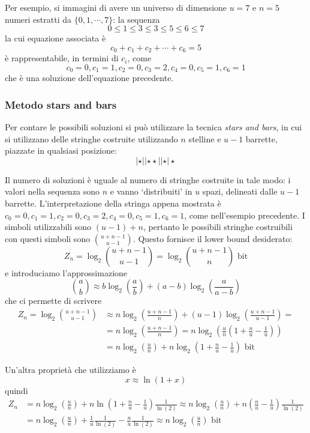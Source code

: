 Per esempio, si immagini di avere un universo di dimensione $u = 7$ e $n = 5$ numeri
estratti da $\{0, 1, \cdots, 7\}$: la sequenza
$$
	0 \leq 1 \leq 3 \leq 3 \leq 5 \leq 6 \le 7
$$
la cui equazione associata è
$$
	c_0 + c_1 + c_2 + \cdots + c_6 = 5
$$
è rappresentabile, in termini di $c_i$, come
$$
	c_0 = 0, c_1 = 1, c_2 = 0, c_3 = 2, c_4 = 0, c_5 = 1, c_6 = 1
$$
che è una soluzione dell'equazione precedente.

\subsubsection{Metodo stars and bars}
Per contare le possibili soluzioni si può utilizzare la tecnica \textit{stars and bars}, in
cui si utilizzano delle stringhe costruite utilizzando $n$ stelline e $u-1$ barrette, piazzate
in qualsiasi posizione:
$$
	| \star || \star \star || \star | \star
$$

Il numero di soluzioni è uguale al numero di stringhe costruite in tale modo: i valori nella sequenza
sono $n$ e vanno `distribuiti' in $u$ spazi, delineati dalle $u-1$ barrette. L'interpretazione della
stringa appena mostrata è $ c_0 = 0, c_1 = 1, c_2 = 0, c_3 = 2, c_4 = 0, c_5 = 1, c_6 = 1 $, come
nell'esempio precedente. I simboli utilizzabili sono $(u-1) + n$, pertanto le possibili stringhe
costruibili con questi simboli sono  ${u + n -1}\choose{u - 1}$.
Questo fornisce il lower bound desiderato:
$$
	Z_n = \log_2{{u + n -1}\choose{u - 1}} = \log_2{{u + n - 1}\choose{n}} \text{ bit}
$$
e introduciamo l'approssimazione
$$
	{{a}\choose{b}} \approx b \log_2(\frac{a}{b}) + (a - b)\log_2(\frac{a}{a-b})
$$
che ci permette di scrivere
\begin{align*}
	Z_n = \log_2{{u + n -1}\choose{u - 1}} & \approx n \log_2(\frac{u + n -1}{n}) + (u -1) \log_2(\frac{u + n - 1}{u - 1}) =        \\
	                                       & = n \log_2(\frac{u + n - 1}{n}) = n \log_2(\frac{u}{n}(1 + \frac{n}{u} - \frac{1}{u})) \\
	                                       & = n \log_2(\frac{u}{n}) + n \log_2(1 + \frac{n}{u} - \frac{1}{u}) \text{ bit}
\end{align*}

\noindent
Un'altra proprietà che utilizziamo è
$$
	x \approx \ln(1 + x)
$$
quindi
\begin{align*}
	Z_n & = n \log_2(\frac{u}{n}) + n \ln(1 + \frac{n}{u}-\frac{1}{u})\frac{1}{\ln(2)}
	\approx n \log_2(\frac{u}{n}) + n (\frac{n}{u}-\frac{1}{u})\frac{1}{\ln(2)}               \\
	    & = n \log_2(\frac{u}{n}) + \frac{1}{u}\frac{1}{\ln(2)} - \frac{n}{u}\frac{1}{\ln(2)}
	\approx n \log_2(\frac{u}{n}) \text{ bit}
\end{align*}

